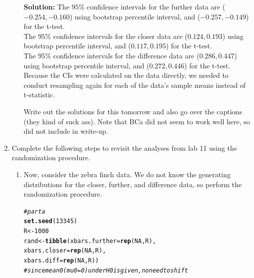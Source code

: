 \documentclass{article}\usepackage[]{graphicx}\usepackage[]{xcolor}
\makeatletter
\newcommand{\hlnum}[1]{\textcolor[rgb]{0.686,0.059,0.569}{#1}}%
\newcommand{\hlcom}[1]{\textcolor[rgb]{0.678,0.584,0.686}{\textit{#1}}}%
\newcommand{\hldef}[1]{\textcolor[rgb]{0.345,0.345,0.345}{#1}}%
\newcommand{\hlkwb}[1]{\textcolor[rgb]{0.69,0.353,0.396}{#1}}%
\newcommand{\hlkwc}[1]{\textcolor[rgb]{0.333,0.667,0.333}{#1}}%
\newcommand{\hlkwd}[1]{\textcolor[rgb]{0.737,0.353,0.396}{\textbf{#1}}}%
\newenvironment{kframe}{%
 \def\at@end@of@kframe{}%
 \ifinner\ifhmode%
  \def\at@end@of@kframe{\end{minipage}}%
  \begin{minipage}{\columnwidth}%
 \fi\fi%
 \def\FrameCommand##1{\hskip\@totalleftmargin \hskip-\fboxsep
 \colorbox{shadecolor}{##1}\hskip-\fboxsep
     \hskip-\linewidth \hskip-\@totalleftmargin \hskip\columnwidth}%
 \MakeFramed {\advance\hsize-\width
   \@totalleftmargin\z@ \linewidth\hsize
   \@setminipage}}%
 {\par\unskip\endMakeFramed%
 \at@end@of@kframe}
\newenvironment{knitrout}{}{} %
\makeatother
\begin{document}
\begin{enumerate}
\begin{enumerate}
\begin{knitrout}
\begin{kframe}
\end{kframe}
\end{knitrout}
\textbf{Solution:} The $95\%$ confidence intervals for the further data are ($-0.254, -0.160$) using bootstrap percentile interval, and ($-0.257, -0.149$) for the t-test.\\
The $95\%$ confidence intervals for the closer data are ($0.124, 0.193$) using bootstrap percentile interval, and ($0.117, 0.195$) for the t-test. \\
The $95\%$ confidence intervals for the difference data are ($0.286, 0.447$) using bootstrap percentile interval, and ($0.272, 0.446$) for the t-test. \\
Because the CIs were calculated on the data directly, we needed to conduct resampling again for each of the data's sample means instead of t-statistic. 

Write out the solutions for this tomorrow and also go over the captions (they kind of suck ass). Note that BCa did not seem to work well here, so did not include in write-up.
\end{enumerate}
\item Complete the following steps to revisit the analyses from lab 11 using the
randomization procedure.
\begin{enumerate}
\item Now, consider the zebra finch data. We do not know the generating distributions
for the closer, further, and difference data, so perform the randomization procedure. \\
\begin{knitrout}
\color{fgcolor}\begin{kframe}
\begin{alltt}
\hlcom{# part a}
\hlkwd{set.seed}\hldef{(}\hlnum{13345}\hldef{)}
\hldef{R} \hlkwb{<-} \hlnum{1000}
\hldef{rand} \hlkwb{<-} \hlkwd{tibble}\hldef{(}\hlkwc{xbars.further} \hldef{=} \hlkwd{rep}\hldef{(}\hlnum{NA}\hldef{, R),}
               \hlkwc{xbars.closer} \hldef{=} \hlkwd{rep}\hldef{(}\hlnum{NA}\hldef{, R),}
               \hlkwc{xbars.diff} \hldef{=} \hlkwd{rep}\hldef{(}\hlnum{NA}\hldef{, R))}
\hlcom{# since mean 0 (mu0 = 0) under H0 is given, no need to shift}


\end{alltt}
\end{kframe}
\end{knitrout}
\end{enumerate}
\end{enumerate}
\end{document}

